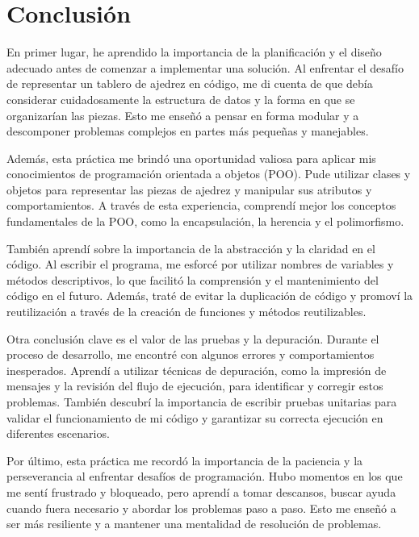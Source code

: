 \chapter{Conclusión}

En primer lugar, he aprendido la importancia de la planificación y el diseño adecuado antes de comenzar a implementar una solución. Al enfrentar el desafío de representar un tablero de ajedrez en código, me di cuenta de que debía considerar cuidadosamente la estructura de datos y la forma en que se organizarían las piezas. Esto me enseñó a pensar en forma modular y a descomponer problemas complejos en partes más pequeñas y manejables.\newline

Además, esta práctica me brindó una oportunidad valiosa para aplicar mis conocimientos de programación orientada a objetos (POO). Pude utilizar clases y objetos para representar las piezas de ajedrez y manipular sus atributos y comportamientos. A través de esta experiencia, comprendí mejor los conceptos fundamentales de la POO, como la encapsulación, la herencia y el polimorfismo.\newline

También aprendí sobre la importancia de la abstracción y la claridad en el código. Al escribir el programa, me esforcé por utilizar nombres de variables y métodos descriptivos, lo que facilitó la comprensión y el mantenimiento del código en el futuro. Además, traté de evitar la duplicación de código y promoví la reutilización a través de la creación de funciones y métodos reutilizables.\newline

Otra conclusión clave es el valor de las pruebas y la depuración. Durante el proceso de desarrollo, me encontré con algunos errores y comportamientos inesperados. Aprendí a utilizar técnicas de depuración, como la impresión de mensajes y la revisión del flujo de ejecución, para identificar y corregir estos problemas. También descubrí la importancia de escribir pruebas unitarias para validar el funcionamiento de mi código y garantizar su correcta ejecución en diferentes escenarios.\newline

Por último, esta práctica me recordó la importancia de la paciencia y la perseverancia al enfrentar desafíos de programación. Hubo momentos en los que me sentí frustrado y bloqueado, pero aprendí a tomar descansos, buscar ayuda cuando fuera necesario y abordar los problemas paso a paso. Esto me enseñó a ser más resiliente y a mantener una mentalidad de resolución de problemas.\newline


